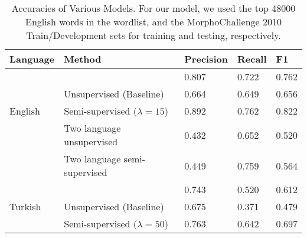 \documentclass[11pt,twocolumn]{article}
\begin{document}
\begin{table*}
    \begin{center}
        \begin{tabular}{ | l | l | l | l | l |}
            \hline
            Language & Method & Precision & Recall & F1 \\ \hline
                     & \citeauthor{Narasimhan15} & 0.807 & 0.722 & 0.762 \\ 
                     & Unsupervised (Baseline) & 0.664  & 0.649 & 0.656 \\ 
            English & Semi-supervised ($\lambda=15$) & 0.892 & 0.762 & 0.822 \\ 
                    & Two language unsupervised & 0.432 & 0.652 & 0.520 \\ 
                    & Two language semi-supervised & 0.449 & 0.759 & 0.564 \\ \hline
                    & \citeauthor{Narasimhan15} & 0.743 & 0.520 & 0.612 \\ 
            Turkish & Unsupervised (Baseline) & 0.675 & 0.371 & 0.479 \\ 
                    & Semi-supervised ($\lambda=50$) & 0.763 & 0.642 & 0.697 \\ \hline
        \end{tabular}
        \caption{Accuracies of Various Models. For our model, we used the top 48000 English words in the wordlist,
        and the MorphoChallenge 2010 Train/Development sets for training and testing, respectively.}
    \end{center}
\end{table*}
\end{document}

